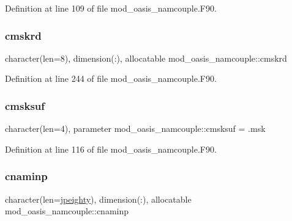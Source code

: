 Definition at line 109 of file mod\+\_\+oasis\+\_\+namcouple.\+F90.

\mbox{\label{namespacemod__oasis__namcouple_a28c3f9e076a686c8ef916221e8fe4e10}} 
\subsubsection{\texorpdfstring{cmskrd}{cmskrd}}
{\footnotesize\ttfamily character(len=8), dimension(\+:), allocatable mod\+\_\+oasis\+\_\+namcouple\+::cmskrd\hspace{0.3cm}{\ttfamily [private]}}



Definition at line 244 of file mod\+\_\+oasis\+\_\+namcouple.\+F90.

\mbox{\label{namespacemod__oasis__namcouple_aeea3ba680d5ba05a432c12d64c68c8af}} 
\subsubsection{\texorpdfstring{cmsksuf}{cmsksuf}}
{\footnotesize\ttfamily character(len=4), parameter mod\+\_\+oasis\+\_\+namcouple\+::cmsksuf = \textquotesingle{}.msk\textquotesingle{}\hspace{0.3cm}{\ttfamily [private]}}



Definition at line 116 of file mod\+\_\+oasis\+\_\+namcouple.\+F90.

\mbox{\label{namespacemod__oasis__namcouple_a1f6ff08cee0c3c5deb262c1447d88328}} 
\subsubsection{\texorpdfstring{cnaminp}{cnaminp}}
{\footnotesize\ttfamily character(len=\hyperlink{namespacemod__oasis__namcouple_a4fb10ad6e864dcbe34c4a8b02204a523}{jpeighty}), dimension(\+:), allocatable mod\+\_\+oasis\+\_\+namcouple\+::cnaminp\hspace{0.3cm}{\ttfamily [private]}}



